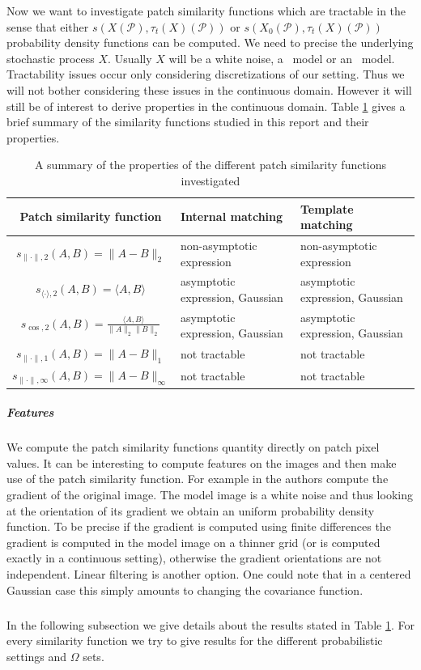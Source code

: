 Now we want to investigate patch similarity functions which are tractable in the
sense that either $s\left(X(\mathcal{P}), \tau_t(X)(\mathcal{P})\right)$ or
$s\left(X_0(\mathcal{P}), \tau_t(X)(\mathcal{P})\right)$ probability density
functions can be computed. We need to precise the underlying stochastic process
$X$. Usually $X$ will be a white noise, a \DSN \ model or an \ADSN \ model.\\
 Tractability issues occur only
considering discretizations of our setting. Thus we will not bother considering
these issues in the continuous domain.  However it will still be of interest to
derive properties in the continuous domain. Table \ref{tab:patch_sim} gives a brief summary of
the similarity functions studied in this report and their properties.
\begin{table}[h]
  \begin{tabularx}{\textwidth}{|c||X|X|}
    \hline
    Patch similarity function & Internal matching & Template matching \\ \hline \hline
    $s_{\|\cdot\|,2}(A,B) = \| A-B \|_2$ & non-asymptotic expression  &  non-asymptotic expression \\ \hline
    $s_{\langle \cdot\rangle,2}(A,B) = \langle A,B \rangle$ & asymptotic expression, Gaussian  &  asymptotic expression, Gaussian \\ \hline
    $s_{\cos,2}(A,B) = \frac{\langle A,B \rangle}{\|A\|_2\|B\|_2}$ &  asymptotic expression, Gaussian &   asymptotic expression, Gaussian \\ \hline
    $s_{\|\cdot\|,1}(A,B) = \| A-B \|_1$ & not tractable  &  not tractable \\ \hline
    $s_{\|\cdot\|,\infty}(A,B) = \| A-B \|_{\infty}$ & not tractable  &  not tractable \\ \hline    
  \end{tabularx}
  \caption{A summary of the properties of the different patch similarity functions investigated}
  \label{tab:patch_sim}
\end{table}
\subparagraph{Features} We compute the patch similarity functions quantity
directly on patch pixel values. It can be interesting to compute features on the
images and then make use of the patch similarity function.  For example in \cite{patraucean2013detection} the authors compute the gradient of the original image. The model image is a
white noise and thus looking at the orientation of its gradient we obtain an
uniform probability density function. To be precise if the gradient is computed
using finite differences the gradient is computed in the model image on a
thinner grid (or is computed exactly in a continuous setting), otherwise the
gradient orientations are not independent. Linear filtering is another
option. One could note that in a centered Gaussian case this simply amounts to
changing the covariance function.  \subparagraph{} In the following subsection
we give details about the results stated in Table \ref{tab:patch_sim}. For every similarity
function we try to give results for the different probabilistic settings and
$\Omega$ sets.
